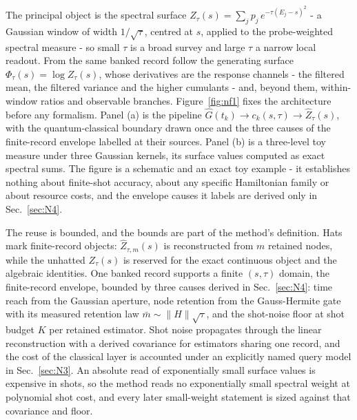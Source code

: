 The principal object is the spectral surface $Z_\tau(s) = \sum_j p_j\, e^{-\tau (E_j - s)^2}$ - a Gaussian window of width $1/\sqrt{\tau}$, centred at $s$, applied to the probe-weighted spectral measure - so small $\tau$ is a broad survey and large $\tau$ a narrow local readout. From the same banked record follow the generating surface $\Phi_\tau(s) = \log Z_\tau(s)$, whose derivatives are the response channels - the filtered mean, the filtered variance and the higher cumulants - and, beyond them, within-window ratios and observable branches. Figure~\ref{fig:nf1} fixes the architecture before any formalism. Panel (a) is the pipeline $\hat{G}(t_k) \to c_k(s,\tau) \to \hat{Z}_\tau(s)$, with the quantum-classical boundary drawn once and the three causes of the finite-record envelope labelled at their sources. Panel (b) is a three-level toy measure under three Gaussian kernels, its surface values computed as exact spectral sums. The figure is a schematic and an exact toy example - it establishes nothing about finite-shot accuracy, about any specific Hamiltonian family or about resource costs, and the envelope causes it labels are derived only in Sec.~\ref{sec:N4}.

The reuse is bounded, and the bounds are part of the method's definition. Hats mark finite-record objects: $\hat{Z}_{\tau,m}(s)$ is reconstructed from $m$ retained nodes, while the unhatted $Z_\tau(s)$ is reserved for the exact continuous object and the algebraic identities. One banked record supports a finite $(s, \tau)$ domain, the finite-record envelope, bounded by three causes derived in Sec.~\ref{sec:N4}: time reach from the Gaussian aperture, node retention from the Gauss-Hermite gate with its measured retention law $\bar{m} \sim \|H\|\sqrt{\tau}$, and the shot-noise floor at shot budget $K$ per retained estimator. Shot noise propagates through the linear reconstruction with a derived covariance for estimators sharing one record, and the cost of the classical layer is accounted under an explicitly named query model in Sec.~\ref{sec:N3}. An absolute read of exponentially small surface values is expensive in shots, so the method reads no exponentially small spectral weight at polynomial shot cost, and every later small-weight statement is sized against that covariance and floor.

